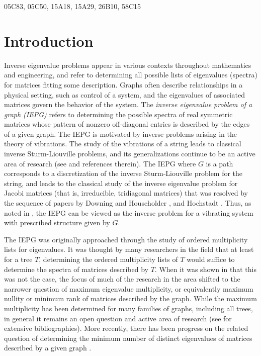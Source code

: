 \documentclass[11pt]{article}
\theoremstyle{definition}
\theoremstyle{definition}
\theoremstyle{definition}
\begin{document}
 05C83, 05C50, 15A18, 15A29, 26B10, 	58C15  	%

\section{Introduction}




 Inverse eigenvalue problems appear in various contexts throughout mathematics and engineering, and refer to determining all possible lists of eigenvalues (spectra)  for matrices fitting some description. Graphs often describe relationships in a physical setting, such as control of a system, and the eigenvalues of associated matrices govern the behavior of the system.   The {\em inverse eigenvalue problem of a graph (IEPG)} refers to determining the possible spectra of real symmetric matrices whose pattern of nonzero off-diagonal entries is described by the edges of a given graph.  The IEPG is motivated by inverse problems arising in 
the theory of vibrations.  The study of the vibrations of a string leads to  classical inverse 
Sturm-Liouville problems, and its generalizations continue to be an active area of research 
(see \cite{G} and references therein). The IEPG where $G$ is a path corresponds to a discretization 
of the  inverse Sturm-Liouville problem for the string, and leads to the classical study of the inverse
eigenvalue problem for Jacobi matrices (that is, irreducible, tridiagonal matrices) 
that was resolved by the sequence of papers by Downing and Householder \cite{DH},  and Hochstadt \cite{H1, H2}.  Thus, as noted in \cite{G}, the IEPG can be viewed as  the 
inverse problem for a vibrating system with prescribed structure given by $G$. 



The IEPG was originally approached through   the study of  ordered multiplicity lists for eigenvalues.  It was thought by many researchers in the field that at least for a tree $T$, determining the ordered multiplicity lists of $T$ would suffice to determine the spectra of matrices described by $T$. When it was shown in \cite{BF04} that this was not the case, the focus of much of the research in the area shifted to the narrower question of maximum eigenvalue multiplicity, or equivalently maximum nullity or minimum rank of matrices described by the graph.  While the maximum multiplicity has been determined for many  families of graphs, including all trees, in general it remains an open question and active area of research (see \cite{FH, HLA2} for  extensive bibliographies).  More recently, there has been progress on the related question of determining the minimum number of distinct eigenvalues of matrices  described by a given graph \cite{AACFMN13, genSAP}.  
\end{document}
